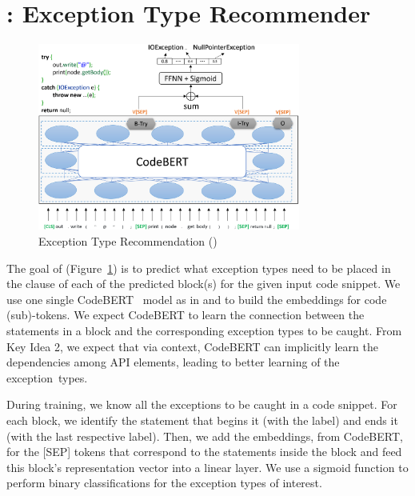 \section{{\xtype}: Exception Type Recommender}
\label{sec:xtype}

\begin{figure}[t]
\begin{center}
\includegraphics[width=3.4in]{xtype-7.png} %
\vspace{-19pt}
\caption{Exception Type Recommendation ({\xtype})}
\label{fig:xtype}
\end{center}
\end{figure}

The goal of {\xtype} (Figure~\ref{fig:xtype}) is to predict what
exception types need to be placed in the  clause of each
of the predicted  block(s) for the given input code
snippet. We use one single CodeBERT~\cite{codebert-emnlp20} model as
in {\xblock} and {\xstate} to build the embeddings for code (sub)-tokens.
%
We expect CodeBERT to learn the connection between the statements in a
 block and the corresponding exception types to be
caught. From Key Idea 2, we expect that via context, CodeBERT can
implicitly learn the dependencies among API elements, leading to
better learning of the exception~types.

During training, we know all the exceptions to be caught in a code
snippet. For each  block, we identify the statement
that begins it (with the  label) and ends it (with the
last respective  label). Then, we add the embeddings, from
CodeBERT, for the [SEP] tokens that correspond to the statements
inside the  block and feed this  block's representation vector into a linear layer.
We use a sigmoid function to perform binary classifications for the
exception types of interest.

